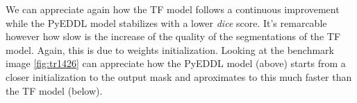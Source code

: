 \begin{figure}[!htb]

    
\end{figure}

\vspace{-7pt}
We can appreciate again how the TF model follows a continuous improvement while the PyEDDL model stabilizes with a lower \textit{dice} score. It's remarcable however how slow is the increase of the quality of the segmentations of the TF model. Again, this is due to weights initialization. Looking at the benchmark image \ref{fig:tr1426} can appreciate how the PyEDDL model (above) starts from a closer initialization to the output mask and aproximates to this much faster than the TF model (below).

